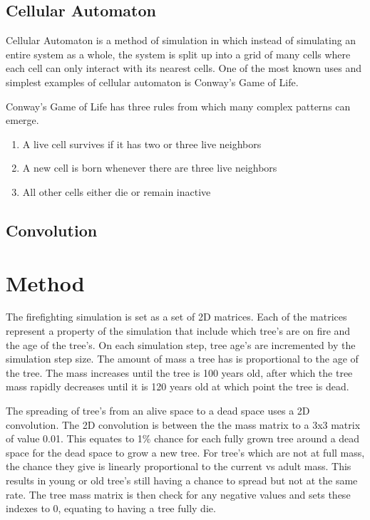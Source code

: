 \documentclass[ aps, pra, reprint, notitlepage ]{revtex4-1}
\begin{document}

\subsection{\label{CellularAutomaton} Cellular Automaton}

Cellular Automaton is a method of simulation in which instead of simulating an entire system as a whole, the system is split up into a grid of many cells where each cell can only interact with its nearest cells. One of the most known uses and simplest examples of cellular automaton is Conway's Game of Life.

Conway's Game of Life has three rules from which many complex patterns can emerge.\cite{ConwayGoL}
\begin{enumerate}
	\item A live cell survives if it has two or three live neighbors
	\item A new cell is born whenever there are three live neighbors
	\item All other cells either die or remain inactive
\end{enumerate}



\subsection{\label{Convolution} Convolution}


\section{\label{Method}Method}

The firefighting simulation is set as a set of 2D matrices. Each of the matrices represent a property of the simulation that include which tree's are on fire and the age of the tree's. On each simulation step, tree age's are incremented by the simulation step size. The amount of mass a tree has is proportional to the age of the tree. The mass increases until the tree is 100 years old, after which the tree mass rapidly decreases until it is 120 years old at which point the tree is dead.

The spreading of tree's from an alive space to a dead space uses a 2D convolution. The 2D convolution is between the the mass matrix to a 3x3 matrix of value 0.01. This equates to 1\% chance for each fully grown tree around a dead space for the dead space to grow a new tree. For tree's which are not at full mass, the chance they give is linearly proportional to the current vs adult mass. This results in young or old tree's still having a chance to spread but not at the same rate. The tree mass matrix is then check for any negative values and sets these indexes to 0, equating to having a tree fully die.
\end{document}
